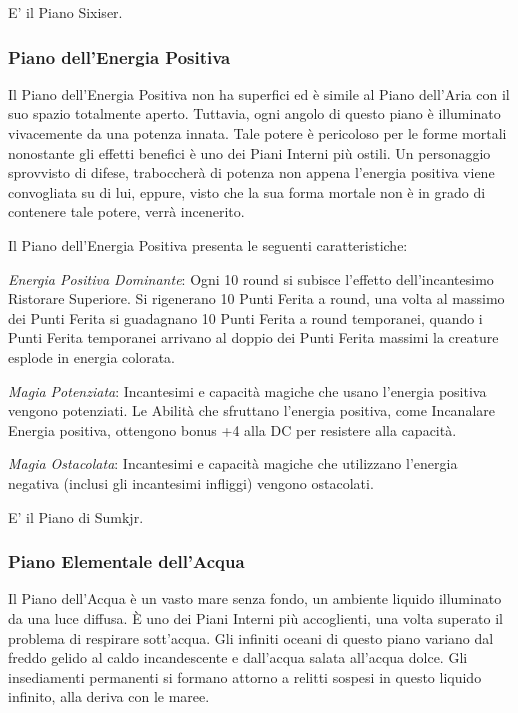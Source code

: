 \documentclass[a4paper,twoside,openany]{book}
\begin{document}
\begin{multicols}{2}
E' il Piano Sixiser.

\subsubsection{Piano dell'Energia Positiva}\label{pianoenergiapositiva}
Il Piano dell'Energia Positiva non ha superfici ed è simile al Piano dell'Aria con il suo spazio totalmente aperto. Tuttavia, ogni angolo di questo piano è illuminato vivacemente da una potenza innata. Tale potere è pericoloso per le forme mortali nonostante gli effetti benefici è uno dei Piani Interni più ostili. Un personaggio sprovvisto di difese, traboccherà di potenza non appena l'energia positiva viene convogliata su di lui, eppure, visto che la sua forma mortale non è in grado di contenere tale potere, verrà incenerito.

Il Piano dell'Energia Positiva presenta le seguenti caratteristiche:

\emph{Energia Positiva Dominante}: Ogni 10 round si subisce l'effetto dell'incantesimo Ristorare Superiore. Si rigenerano 10 Punti Ferita a round, una volta al massimo dei Punti Ferita si guadagnano 10 Punti Ferita a round temporanei, quando i Punti Ferita temporanei arrivano al doppio dei Punti Ferita massimi la creature esplode in energia colorata.

\emph{Magia Potenziata}: Incantesimi e capacità magiche che usano l'energia positiva vengono potenziati. Le Abilità che sfruttano l'energia positiva, come Incanalare Energia positiva, ottengono bonus +4 alla DC per resistere alla capacità.

\emph{Magia Ostacolata}: Incantesimi e capacità magiche che utilizzano l'energia negativa (inclusi gli incantesimi infliggi) vengono ostacolati.

E' il Piano di Sumkjr.

\subsubsection{Piano Elementale dell'Acqua}\label{pianoacqua}
Il Piano dell'Acqua è un vasto mare senza fondo, un ambiente liquido illuminato da una luce diffusa. È uno dei Piani Interni più accoglienti, una volta superato il problema di respirare sott'acqua. Gli infiniti oceani di questo piano variano dal freddo gelido al caldo incandescente e dall'acqua salata all'acqua dolce. Gli insediamenti permanenti si formano attorno a relitti sospesi in questo liquido infinito, alla deriva con le maree.


\end{multicols}
\end{document}
